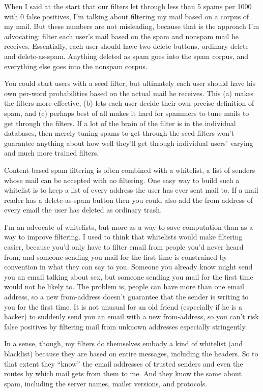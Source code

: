 \documentclass[12pt]{book}
\begin{document}
When I said at the start that our filters let through less than 5 spams
per 1000 with 0 false positives, I'm talking about filtering my mail
based on a corpus of my mail. But these numbers are not misleading,
because that is the approach I'm advocating: filter each user's mail
based on the spam and nonspam mail he receives. Essentially, each user
should have two delete buttons, ordinary delete and delete-as-spam.
Anything deleted as spam goes into the spam corpus, and everything else
goes into the nonspam corpus.

You could start users with a seed filter, but ultimately each user
should have his own per-word probabilities based on the actual mail he
receives. This (a) makes the filters more effective, (b) lets each user
decide their own precise definition of spam, and (c) perhaps best of all
makes it hard for spammers to tune mails to get through the filters. If
a lot of the brain of the filter is in the individual databases, then
merely tuning spams to get through the seed filters won't guarantee
anything about how well they'll get through individual users' varying
and much more trained filters.

Content-based spam filtering is often combined with a whitelist, a list
of senders whose mail can be accepted with no filtering. One easy way to
build such a whitelist is to keep a list of every address the user has
ever sent mail to. If a mail reader has a delete-as-spam button then you
could also add the from address of every email the user has deleted as
ordinary trash.

I'm an advocate of whitelists, but more as a way to save computation
than as a way to improve filtering. I used to think that whitelists
would make filtering easier, because you'd only have to filter email
from people you'd never heard from, and someone sending you mail for the
first time is constrained by convention in what they can say to you.
Someone you already know might send you an email talking about sex, but
someone sending you mail for the first time would not be likely to. The
problem is, people can have more than one email address, so a new
from-address doesn't guarantee that the sender is writing to you for the
first time. It is not unusual for an old friend (especially if he is a
hacker) to suddenly send you an email with a new from-address, so you
can't risk false positives by filtering mail from unknown addresses
especially stringently.

In a sense, though, my filters do themselves embody a kind of whitelist
(and blacklist) because they are based on entire messages, including the
headers. So to that extent they ``know'' the email addresses of trusted
senders and even the routes by which mail gets from them to me. And they
know the same about spam, including the server names, mailer versions,
and protocols.
\end{document}
